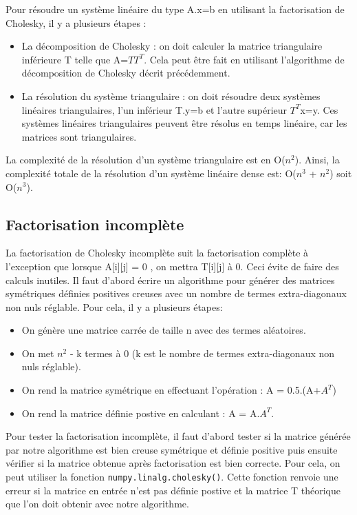 \documentclass{article}
\begin{document}
Pour résoudre un système linéaire du type A.x=b en utilisant la factorisation de Cholesky, il y a plusieurs étapes : 
\begin{itemize}
    \item La décomposition de Cholesky : on doit calculer la matrice triangulaire inférieure T telle que A=$TT^{T}$. Cela peut être fait en utilisant l'algorithme de décomposition de Cholesky décrit précédemment.
    \item La résolution du système triangulaire : on doit résoudre deux systèmes linéaires triangulaires, l'un inférieur T.y=b et l'autre supérieur $T^{T}$x=y. Ces systèmes linéaires triangulaires peuvent être résolus en temps linéaire, car les matrices sont triangulaires. 
\end{itemize}
La complexité de la résolution d'un système triangulaire est en O($n^2$). Ainsi, la complexité totale de la résolution d'un système linéaire dense est: O($n^3$ + $n^2$) soit O($n^3$). 

\subsection{Factorisation incomplète}
\label{ssec:factor_incompl}
La factorisation de Cholesky incomplète suit la factorisation complète à l'exception que lorsque A[i][j] = 0 , on mettra T[i][j] à 0. Ceci évite de faire des calculs inutiles. 
Il faut d'abord écrire un algorithme pour générer des matrices symétriques définies positives creuses avec un nombre de termes extra-diagonaux non nuls réglable. Pour cela, il y a plusieurs étapes:
\begin{itemize}
    \item On génère une matrice carrée de taille n avec des termes aléatoires.
    \item On met $n^2$ - k termes à 0 (k est le nombre de termes extra-diagonaux non nuls réglable).
    \item On rend la matrice symétrique en effectuant l'opération : A = 0.5.(A+$A^{T}$)
    \item On rend la matrice définie postive en calculant : A = A.$A^{T}$.

\end{itemize}

Pour tester la factorisation incomplète, il faut d'abord tester si la matrice générée par notre algorithme est bien creuse symétrique et définie positive puis ensuite vérifier si la matrice obtenue après factorisation est bien correcte. 
Pour cela, on peut utiliser la fonction \verb|numpy.linalg.cholesky()|. Cette fonction renvoie une erreur si la matrice en entrée n'est pas définie postive et la matrice T théorique que l'on doit obtenir avec notre algorithme.
\end{document}

